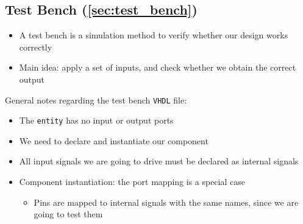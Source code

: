 \subsection{Test Bench (\ref{sec:test_bench})}

\begin{itemize}

\item A test bench is a simulation method to verify whether our design works correctly

\item Main idea: apply a set of inputs, and check whether we obtain the correct output
\end{itemize}

General notes regarding the test bench \verb|VHDL| file:

\begin{itemize}

\item The \verb|entity| has no input or output ports

\item We need to declare and instantiate our component

\item All input signals we are going to drive must be declared as internal signals

\item Component instantiation: the port mapping is a special case

	\begin{itemize}
	\item Pins are mapped to internal signals with the same names, since we are going to test them
	\end{itemize}

\end{itemize}









